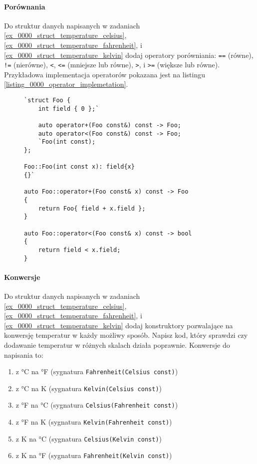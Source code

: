 \documentclass[11pt,a4paper,titlepage,onecolumn]{article}
\begin{document}
\paragraph{Porównania}\label{ex_0000_comparison_ops} Do struktur danych napisanych w zadaniach
\ref{ex_0000_struct_temperature_celsius},
\ref{ex_0000_struct_temperature_fahrenheit}, i
\ref{ex_0000_struct_temperature_kelvin} dodaj operatory porówniania:
\texttt{==} (równe),
\texttt{!=} (nierówne),
\texttt{<},
\texttt{<=} (mniejsze lub równe),
\texttt{>}, i
\texttt{>=} (większe lub równe).
Przykładowa implementacja operatorów pokazana jest na
listingu \ref{listing_0000_operator_implemetation}.

\begin{figure}[!htp]
{\small
\begin{lstlisting}[caption={implementacja operatora},
    captionpos=b,
    label=listing_0000_operator_implemetation]
`struct Foo {
    int field { 0 };`

    auto operator+(Foo const&) const -> Foo;
    auto operator<(Foo const&) const -> Foo;
    `Foo(int const);
};

Foo::Foo(int const x): field{x}
{}`

auto Foo::operator+(Foo const& x) const -> Foo
{
    return Foo{ field + x.field };
}

auto Foo::operator<(Foo const& x) const -> bool
{
    return field < x.field;
}
\end{lstlisting}}
\end{figure}

\paragraph{Konwersje} Do struktur danych napisanych w zadaniach
\ref{ex_0000_struct_temperature_celsius},
\ref{ex_0000_struct_temperature_fahrenheit}, i
\ref{ex_0000_struct_temperature_kelvin} dodaj konstruktory pozwalające na
konwersję temperatur w każdy możliwy sposób. Napisz kod, który sprawdzi czy
dodawanie temperatur w różnych skalach działa poprawnie. Konwersje do napisania
to:
\begin{enumerate}
    \item z °C na °F (sygnatura \texttt{Fahrenheit(Celsius const)})
    \item z °C na K (sygnatura \texttt{Kelvin(Celsius const)})
    \item z °F na °C (sygnatura \texttt{Celsius(Fahrenheit const)})
    \item z °F na K (sygnatura \texttt{Kelvin(Fahrenheit const)})
    \item z K na °C (sygnatura \texttt{Celsius(Kelvin const)})
    \item z K na °F (sygnatura \texttt{Fahrenheit(Kelvin const)})
\end{enumerate}
\end{document}
